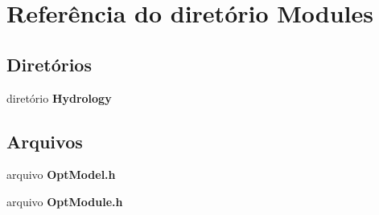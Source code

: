\section{Referência do diretório Modules}
\label{dir_1f25c7e96ed6e9266a76e4bc995a5063}
\subsection*{Diretórios}
\begin{DoxyCompactItemize}
\item 
diretório {\bf Hydrology}
\end{DoxyCompactItemize}
\subsection*{Arquivos}
\begin{DoxyCompactItemize}
\item 
arquivo {\bf Opt\+Model.\+h}
\item 
arquivo {\bf Opt\+Module.\+h}
\end{DoxyCompactItemize}
